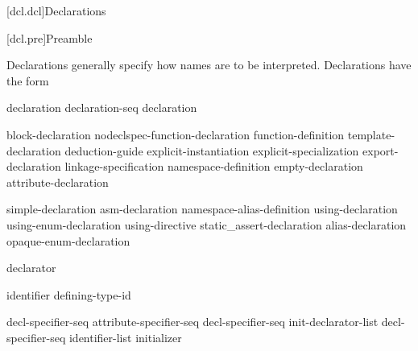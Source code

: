 [dcl.dcl]{Declarations}%



[dcl.pre]{Preamble}

\pnum
Declarations generally specify how names are to be interpreted. Declarations have
the form
\begin{bnf}
\br
    declaration\br
    declaration-seq declaration
\end{bnf}

\begin{bnf}
\br
    block-declaration\br
    nodeclspec-function-declaration\br
    function-definition\br
    template-declaration\br
    deduction-guide\br
    explicit-instantiation\br
    explicit-specialization\br
    export-declaration\br
    linkage-specification\br
    namespace-definition\br
    empty-declaration\br
    attribute-declaration
\end{bnf}

\begin{bnf}
\br
    simple-declaration\br
    asm-declaration\br
    namespace-alias-definition\br
    using-declaration\br
    using-enum-declaration\br
    using-directive\br
    static_assert-declaration\br
    alias-declaration\br
    opaque-enum-declaration
\end{bnf}

\begin{bnf}
\br
     declarator \terminal{;}
\end{bnf}

\begin{bnf}
\br
     identifier  \terminal{=} defining-type-id \terminal{;}
\end{bnf}

\begin{bnf}
\br
    decl-specifier-seq  \terminal{;}\br
    attribute-specifier-seq decl-specifier-seq init-declarator-list \terminal{;}\br
     decl-specifier-seq  \terminal{[} identifier-list \terminal{]} initializer \terminal{;}
\end{bnf}

